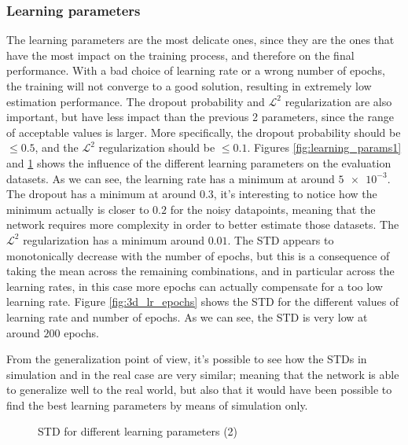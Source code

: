 \documentclass[a4paper,12pt,sort&compress]{article}
\begin{document}
    \subsubsection*{Learning parameters}
    The learning parameters are the most delicate ones, since they are the ones that have the most
    impact on the training process, and therefore on the final performance. With a bad choice of
    learning rate or a wrong number of epochs, the training will not converge to a good solution,
    resulting in extremely low estimation performance. The dropout probability and $\mathcal{L}^2$
    regularization are also important, but have less impact than the previous 2 parameters, since
    the range of acceptable values is larger. More specifically, the dropout probability should be
    $\leq 0.5$, and the $\mathcal{L}^2$ regularization should be $\leq 0.1$. Figures
    \ref{fig:learning_params1} and \ref{fig:learning_params2} shows the influence of the different learning parameters on the
    evaluation datasets. As we can see, the learning rate has a minimum at around $\num{5e-3}$. The
    dropout has a minimum at around $\num{0.3}$, it's interesting to notice how the minimum actually
    is closer to $\num{0.2}$ for the noisy datapoints, meaning that the network requires more
    complexity in order to better estimate those datasets. The $\mathcal{L}^2$ regularization has a
    minimum around $\num{0.01}$. The STD appears to monotonically decrease with the number of
    epochs, but this is a consequence of taking the mean across the remaining combinations, and in
    particular across the learning rates, in this case more epochs can actually compensate for a too
    low learning rate. Figure \ref{fig:3d_lr_epochs} shows the STD for the different values of
    learning rate and number of epochs. As we can see, the STD is very low at around $\num{200}$
    epochs.

    From the generalization point of view, it's possible to see how the STDs in simulation and in the
    real case are very similar; meaning that the network is able to generalize well to the real
    world, but also that it would have been possible to find the best learning parameters by means
    of simulation only. 
    
    \begin{figure}
        \centering
        \begin{subfigure}[b]{\textwidth}
            \centering
        \end{subfigure}
        \begin{subfigure}[b]{\textwidth}
            \centering
        \end{subfigure}
        \caption{STD for different learning parameters (2)}
        \label{fig:learning_params2}
    \end{figure}
\end{document}
